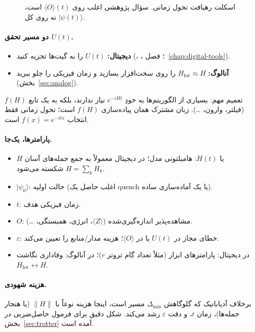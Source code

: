 \begin{figure}[htbp]
	\centering
	\begin{latin}
		\resizebox{0.95\textwidth}{!}{%
		}
	\end{latin}
	\caption{اسکلت رهیافت تحول زمانی. سؤال پژوهشی اغلب روی $\langle O\rangle(t)$ است، نه روی کل $\lvert\psi(t)\rangle$.}
	\label{fig:time-evolution}
\end{figure}

\paragraph{دو مسیر تحقق $U(t)$.}
\begin{itemize}
	\item \textbf{دیجیتال:} $U(t)$ را به گیت‌ها تجزیه کنید (، ، ؛ فصل~\ref{chap:digital-tools}).
	\item \textbf{آنالوگ:} $H_{\mathrm{hw}}\approx H$ را روی سخت‌افزار بسازید و زمان فیزیکی را جلو ببرید (بخش~\ref{sec:analog}).
\end{itemize}
تعمیم مهم: بسیاری از الگوریتم‌ها به خودِ $e^{-iHt}$ نیاز ندارند، بلکه به یک تابع $f(H)$ (فیلتر، وارون، \ldots). زبان مشترک همان پیاده‌سازی $f(H)$ است؛ تحول زمانی فقط انتخاب $f(x)=e^{-itx}$ است.

\paragraph{پارامترها، یک‌جا.}
\begin{itemize}
	\item $H$ یا $H(t)$: هامیلتونی مدل؛ در دیجیتال معمولاً به جمع جمله‌های آسان $H=\sum_k H_k$ شکسته می‌شود.
	\item $\lvert\psi_0\rangle$: حالت اولیه (اغلب حاصل یک quench یا یک آماده‌سازی ساده).
	\item $t$: زمان فیزیکی هدف.
	\item $O$: مشاهده‌پذیر اندازه‌گیری‌شده ($\langle Z\rangle$، انرژی، همبستگی، \ldots).
	\item $\varepsilon$: خطای مجاز در $U(t)$ یا در $\langle O\rangle$؛ هزینه مدار/منابع را تعیین می‌کند.
	\item در دیجیتال: پارامترهای ابزار (مثلاً تعداد گام تروتر $r$)؛ در آنالوگ: وفاداری نگاشت $H_{\mathrm{hw}}\leftrightarrow H$.
\end{itemize}

\paragraph{هزینه شهودی.}
برخلاف آدیاباتیک که گلوگاهش $\Delta_{\min}$ مسیر است، اینجا هزینه نوعاً با $\|H\|$ (یا هنجار جمله‌ها)، زمان $t$، و دقت $\varepsilon$ رشد می‌کند. شکل دقیق برای فرمول حاصل‌ضربی در بخش~\ref{sec:trotter} آمده است.

